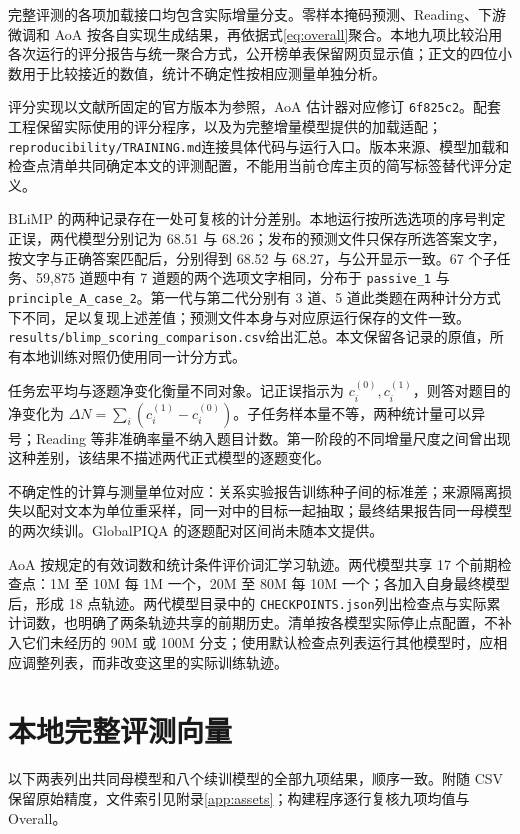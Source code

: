 完整评测的各项加载接口均包含实际增量分支。零样本掩码预测、Reading、下游微调和 AoA 按各自实现生成结果，再依据式\eqref{eq:overall}聚合。本地九项比较沿用各次运行的评分报告与统一聚合方式，公开榜单表保留网页显示值；正文的四位小数用于比较接近的数值，统计不确定性按相应测量单独分析。

评分实现以文献\citet{babylm2026evaluation}所固定的官方版本为参照，AoA 估计器对应修订 \texttt{6f825c2}。配套工程保留实际使用的评分程序，以及为完整增量模型提供的加载适配；\nolinkurl{reproducibility/TRAINING.md}连接具体代码与运行入口。版本来源、模型加载和检查点清单共同确定本文的评测配置，不能用当前仓库主页的简写标签替代评分定义。

BLiMP 的两种记录存在一处可复核的计分差别。本地运行按所选选项的序号判定正误，两代模型分别记为 68.51 与 68.26；发布的预测文件只保存所选答案文字，按文字与正确答案匹配后，分别得到 68.52 与 68.27，与公开显示一致。67 个子任务、59,875 道题中有 7 道题的两个选项文字相同，分布于 \texttt{passive\_1} 与 \texttt{principle\_A\_case\_2}。第一代与第二代分别有 3 道、5 道此类题在两种计分方式下不同，足以复现上述差值；预测文件本身与对应原运行保存的文件一致。\nolinkurl{results/blimp_scoring_comparison.csv}给出汇总。本文保留各记录的原值，所有本地训练对照仍使用同一计分方式。

任务宏平均与逐题净变化衡量不同对象。记正误指示为 $c_i^{(0)},c_i^{(1)}$，则答对题目的净变化为 $\Delta N=\sum_i(c_i^{(1)}-c_i^{(0)})$。子任务样本量不等，两种统计量可以异号；Reading 等非准确率量不纳入题目计数。第一阶段的不同增量尺度之间曾出现这种差别，该结果不描述两代正式模型的逐题变化。

不确定性的计算与测量单位对应：关系实验报告训练种子间的标准差；来源隔离损失以配对文本为单位重采样，同一对中的目标一起抽取；最终结果报告同一母模型的两次续训。GlobalPIQA 的逐题配对区间尚未随本文提供。

AoA 按规定的有效词数和统计条件评价词汇学习轨迹。两代模型共享 17 个前期检查点：1M 至 10M 每 1M 一个，20M 至 80M 每 10M 一个；各加入自身最终模型后，形成 18 点轨迹。两代模型目录中的 \nolinkurl{CHECKPOINTS.json}列出检查点与实际累计词数，也明确了两条轨迹共享的前期历史。清单按各模型实际停止点配置，不补入它们未经历的 90M 或 100M 分支；使用默认检查点列表运行其他模型时，应相应调整列表，而非改变这里的实际训练轨迹。

\FloatBarrier\clearpage
\section{本地完整评测向量}
\label{app:local}

以下两表列出共同母模型和八个续训模型的全部九项结果，顺序一致。附随 CSV 保留原始精度，文件索引见附录\ref{app:assets}；构建程序逐行复核九项均值与 Overall。

